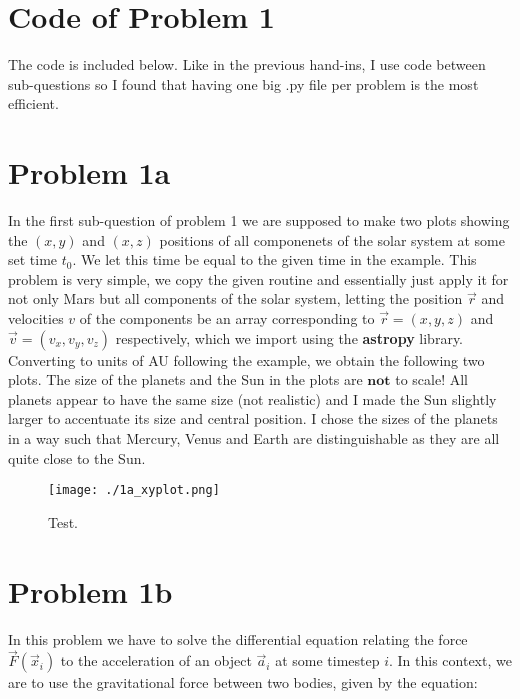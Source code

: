 \section*{Code of Problem 1}

The code is included below. Like in the previous hand-ins, I use code between sub-questions so I found that having one big .py file per problem is the most efficient.


\section*{Problem 1a}

In the first sub-question of problem 1 we are supposed to make two plots showing the $(x,y)$ and $(x,z)$ positions of all componenets of the solar system at some set time $t_0$. We let this time be equal to the given time in the example. This problem is very simple, we copy the given routine and essentially just apply it for not only Mars but all components of the solar system, letting the position $\vec{r}$ and velocities ${v}$ of the components be an array corresponding to $\vec{r} = (x,y,z)$ and $\vec{v} = (v_x,v_y,v_z)$ respectively, which we import using the \textbf{astropy} library. Converting to units of AU following the example, we obtain the following two plots. The size of the planets and the Sun in the plots are $\textbf{not}$ to scale! All planets appear to have the same size (not realistic) and I made the Sun slightly larger to accentuate its size and central position. I chose the sizes of the planets in a way such that Mercury, Venus and Earth are distinguishable as they are all quite close to the Sun. 

\begin{figure}[h!]
  \centering
  \texttt{[image: ./1a\_xyplot.png]}
  \caption{Test.}
\end{figure}


\section*{Problem 1b}

In this problem we have to solve the differential equation relating the force $\vec{F}(\vec{x}_i)$ to the acceleration of an object $\vec{a}_i$ at some timestep $i$. In this context, we are to use the gravitational force between two bodies, given by the equation:\\

